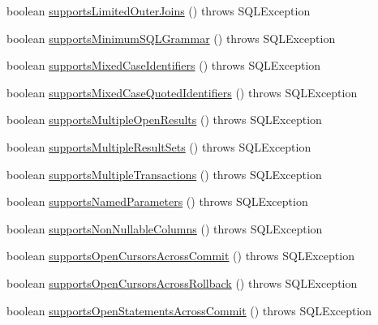 \begin{DoxyCompactItemize}
\item 
boolean \mbox{\hyperlink{classcom_1_1mysql_1_1jdbc_1_1_database_meta_data_a3836a4ce22bb62ebd86dcd3f34c5d9dc}{supports\+Limited\+Outer\+Joins}} ()  throws S\+Q\+L\+Exception 
\item 
boolean \mbox{\hyperlink{classcom_1_1mysql_1_1jdbc_1_1_database_meta_data_adff3fdeb8e6082efd47c296abbab9516}{supports\+Minimum\+S\+Q\+L\+Grammar}} ()  throws S\+Q\+L\+Exception 
\item 
boolean \mbox{\hyperlink{classcom_1_1mysql_1_1jdbc_1_1_database_meta_data_ade3fcbd03cbcbc25ba3cccf0a5461350}{supports\+Mixed\+Case\+Identifiers}} ()  throws S\+Q\+L\+Exception 
\item 
boolean \mbox{\hyperlink{classcom_1_1mysql_1_1jdbc_1_1_database_meta_data_aa91a2f185bf73711f4632304d79240b9}{supports\+Mixed\+Case\+Quoted\+Identifiers}} ()  throws S\+Q\+L\+Exception 
\item 
boolean \mbox{\hyperlink{classcom_1_1mysql_1_1jdbc_1_1_database_meta_data_a55b6f0fa6c64f2d23a6a7a30109a4d60}{supports\+Multiple\+Open\+Results}} ()  throws S\+Q\+L\+Exception 
\item 
boolean \mbox{\hyperlink{classcom_1_1mysql_1_1jdbc_1_1_database_meta_data_a872d95569ec1e763e18a9378f517db42}{supports\+Multiple\+Result\+Sets}} ()  throws S\+Q\+L\+Exception 
\item 
boolean \mbox{\hyperlink{classcom_1_1mysql_1_1jdbc_1_1_database_meta_data_a91ea567250dde12e511a5716d5ef8185}{supports\+Multiple\+Transactions}} ()  throws S\+Q\+L\+Exception 
\item 
boolean \mbox{\hyperlink{classcom_1_1mysql_1_1jdbc_1_1_database_meta_data_af500399c9ce848e48bd0d8f43a3a6966}{supports\+Named\+Parameters}} ()  throws S\+Q\+L\+Exception 
\item 
boolean \mbox{\hyperlink{classcom_1_1mysql_1_1jdbc_1_1_database_meta_data_adffd73673ebc4cf69163b0c4316bad08}{supports\+Non\+Nullable\+Columns}} ()  throws S\+Q\+L\+Exception 
\item 
boolean \mbox{\hyperlink{classcom_1_1mysql_1_1jdbc_1_1_database_meta_data_a6d8847d7fffccd60b1e422bd0e572985}{supports\+Open\+Cursors\+Across\+Commit}} ()  throws S\+Q\+L\+Exception 
\item 
boolean \mbox{\hyperlink{classcom_1_1mysql_1_1jdbc_1_1_database_meta_data_aa62f59f2507559628738530b9377b635}{supports\+Open\+Cursors\+Across\+Rollback}} ()  throws S\+Q\+L\+Exception 
\item 
boolean \mbox{\hyperlink{classcom_1_1mysql_1_1jdbc_1_1_database_meta_data_a6faae6d0fa4fab6a8cf65542804a4e24}{supports\+Open\+Statements\+Across\+Commit}} ()  throws S\+Q\+L\+Exception 

\end{DoxyCompactItemize}
